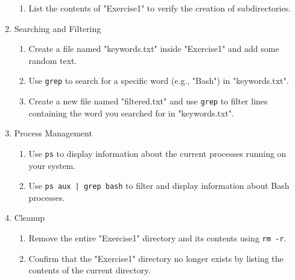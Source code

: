 \begin{enumerate}
\begin{enumerate}
	\item List the contents of "Exercise1" to verify the creation of subdirectories.
\end{enumerate}
\item Searching and Filtering
\begin{enumerate}
	\item Create a file named "keywords.txt" inside "Exercise1" and add some random text.
	\item Use \texttt{grep} to search for a specific word (e.g., "Bash") in "keywords.txt".
	\item Create a new file named "filtered.txt" and use \texttt{grep} to filter lines containing the word you searched for in "keywords.txt".
\end{enumerate}
\item Process Management
\begin{enumerate}
	\item Use \texttt{ps} to display information about the current processes running on your system.
	\item Use \texttt{ps aux | grep bash} to filter and display information about Bash processes.
\end{enumerate}
\item Cleanup
\begin{enumerate}
	\item Remove the entire "Exercise1" directory and its contents using \texttt{rm -r}.
	\item Confirm that the "Exercise1" directory no longer exists by listing the contents of the current directory.
\end{enumerate}
\end{enumerate}

